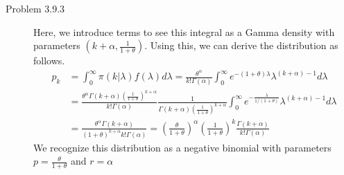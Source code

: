 \documentclass[12pt]{article}  %
\begin{document}
\begin{description}
\item[Problem 3.9.3] Here, we introduce terms to see this integral as a Gamma density with parameters $(k+\alpha, \frac{1}{1+\theta})$. Using this, we can derive the distribution as follows. 
\begin{align*}
p_k &= \int_0^{\infty}\pi(k|\lambda)f(\lambda)d\lambda = \frac{\theta^{\alpha}}{k!\Gamma(\alpha)}\int_{0}^{\infty}e^{-(1+\theta)\lambda}\lambda^{(k+\alpha)-1}d\lambda\\
&= \frac{\theta^{\alpha}\Gamma(k+\alpha)(\frac{1}{1+\theta})^{k+\alpha}}{k!\Gamma(\alpha)}\frac{1}{\Gamma(k+\alpha)(\frac{1}{1+\theta})^{k+\alpha}}\int_{0}^{\infty}e^{-\frac{\lambda}{1/(1+\theta)}}\lambda^{(k+\alpha)-1}d\lambda\\
&= \frac{\theta^{\alpha}\Gamma(k+\alpha)}{(1+\theta)^{k+\alpha}k!\Gamma(\alpha)} = \left(\frac{\theta}{1+\theta}\right)^{\alpha}\left(\frac{1}{1+\theta}\right)^{k}\frac{\Gamma(k+\alpha)}{k!\Gamma(\alpha)}
\end{align*}
We recognize this distribution as a negative binomial with parameters $p = \frac{\theta}{1+\theta}$ and $r = \alpha$

\end{description}	
\end{document}
